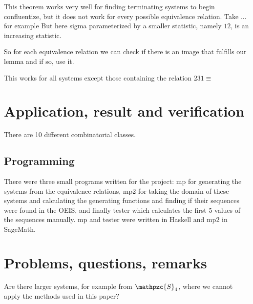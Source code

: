 \documentclass[a4paper, 11pt]{article}
\theoremstyle{definition}
\newcommand{\Sym}{\mathpzc{S}}
\begin{document}
This theorem works very well for finding terminating systems to begin
confluentize, but it does not work for every possible equivalence relation.
Take ... for example
But here sigma parameterized by a smaller statistic, namely $12$, is an
increasing statistic.

So for each equivalence relation we can check if there is an image that fulfills
our lemma and if so, use it.

This works for all systems except those containing the relation $231 \equiv $

\section{Application, result and verification}
There are 10 different combinatorial classes.
\subsection{Programming}
There were three small programs written for the project: mp for generating the
systems from the equivalence relations, mp2 for taking the domain of these
systems and calculating the generating functions and finding if their sequences
were found in the OEIS, and finally tester which calculates the first 5 values
of the sequences manually. mp and tester were written in Haskell and mp2 in SageMath. 


\section{Problems, questions, remarks}
Are there larger systems, for example from $\Sym_4$, where we cannot apply the
methods used in this paper?



\end{document}
